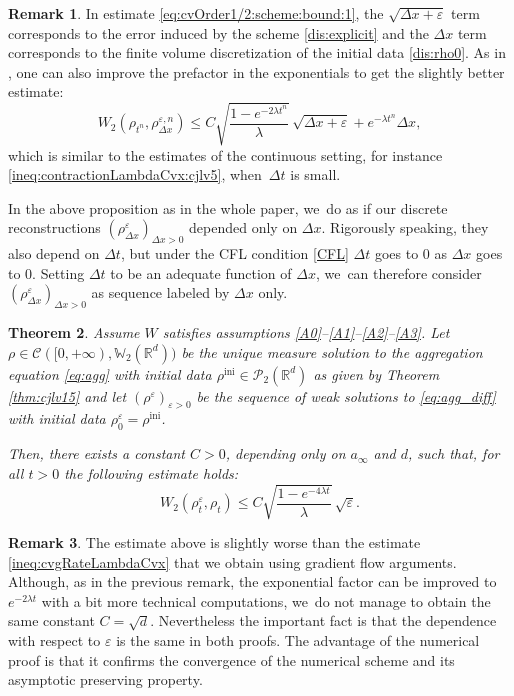 \documentclass[JEP,XML,SOM,Unicode, NoFloatCountersInSection,published]{cedram}
\newcommand{\ini}{\mathrm{ini}}
\def\RR{\mathbb{R}}
\def\WW{\mathbb{W}}
\def\eps{\varepsilon}
\def\dt{\Delta t}
\def\dx{\Delta x}
\def\calC{{\mathcal C}}
\def\calP{{\mathcal P}}
\theoremstyle{plain}
\newtheorem{theorem}{Theorem}[section]
\theoremstyle{definition}
\newtheorem{remark}[theorem]{Remark}
\begin{document}
\begin{remark}\mbox{}
In estimate \eqref{eq:cvOrder1/2:scheme:bound:1}, the $\sqrt{\dx + \eps}$ term corresponds to the error induced by the scheme \eqref{dis:explicit} and the $\dx$ term corresponds to the finite volume discretization of the initial data \eqref{dis:rho0}. As in \cite{dlv20}, one can also improve the prefactor in the exponentials to get the slightly better estimate:
\[
W_2(\rho_{t^n},\rho_{\dx}^{\eps,n} ) \leq C \sqrt{\frac{1 - e^{-2\lambda t^n}}{\lambda}}\, \sqrt{\dx + \eps} + e^{-\lambda t^n} \dx,
\]
which is similar to the estimates of the continuous setting, for instance \eqref{ineq:contractionLambdaCvx:cjlv5}, when~$\dt$ is small.
\end{remark}
In the above proposition as in the whole paper, we~do as if our discrete reconstructions $(\rho_{\dx}^\eps)_{\dx >0}$ depended only on $\dx$. Rigorously speaking, they also depend on $\dt$, but under the CFL condition \eqref{CFL} $\dt$ goes to 0 as $\dx$ goes to 0. Setting $\dt$ to be an adequate function of $\dx$, we~can therefore consider $(\rho_{\dx}^\eps)_{\dx >0}$ as sequence labeled by $\dx$ only.
\begin{theorem}\label{thm:cvOrder1/2:scheme}
Assume $W$ satisfies assumptions \eqref{A0}--\eqref{A1}--\eqref{A2}--\eqref{A3}. Let $\rho \in \calC([0,+\infty), \WW_2(\RR^d))$ be the unique measure solution to the aggregation equation \eqref{eq:agg} with initial data $\rho^{\ini} \in \calP_2(\RR^d)$ as given by Theorem \ref{thm:cjlv15} and let $(\rho^\eps)_{\eps > 0}$ be the sequence of weak solutions to \eqref{eq:agg_diff} with initial data $\rho_0^\eps = \rho^{\ini}$.

Then, there exists a constant $C>0$, depending only on $a_\infty$ and $d$, such that, for all $t>0$ the following estimate holds:
\begin{equation}\label{eq:cvOrder1/2:scheme:bound:2}
W_2(\rho_t^\eps,\rho_t) \leq C \sqrt{\frac{1 - e^{-4\lambda t}}{\lambda}}\, \sqrt{\eps}.
\end{equation}
\end{theorem}
\begin{remark}
The estimate above is slightly worse than the estimate \eqref{ineq:cvgRateLambdaCvx} that we obtain using gradient flow arguments. Although, as in the previous remark, the exponential factor can be improved to $e^{-2\lambda t}$ with a bit more technical computations, we~do not manage to obtain the same constant $C=\sqrt{d}$. Nevertheless the important fact is that the dependence with respect to $\eps$ is the same in both proofs. The advantage of the numerical proof is that it confirms the convergence of the numerical scheme and its asymptotic preserving property.
\end{remark}
\end{document}
